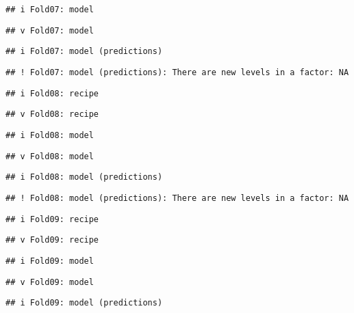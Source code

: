\documentclass[
]{article}
\begin{document}
\begin{verbatim}
## i Fold07: model
\end{verbatim}

\begin{verbatim}
## v Fold07: model
\end{verbatim}

\begin{verbatim}
## i Fold07: model (predictions)
\end{verbatim}

\begin{verbatim}
## ! Fold07: model (predictions): There are new levels in a factor: NA
\end{verbatim}

\begin{verbatim}
## i Fold08: recipe
\end{verbatim}

\begin{verbatim}
## v Fold08: recipe
\end{verbatim}

\begin{verbatim}
## i Fold08: model
\end{verbatim}

\begin{verbatim}
## v Fold08: model
\end{verbatim}

\begin{verbatim}
## i Fold08: model (predictions)
\end{verbatim}

\begin{verbatim}
## ! Fold08: model (predictions): There are new levels in a factor: NA
\end{verbatim}

\begin{verbatim}
## i Fold09: recipe
\end{verbatim}

\begin{verbatim}
## v Fold09: recipe
\end{verbatim}

\begin{verbatim}
## i Fold09: model
\end{verbatim}

\begin{verbatim}
## v Fold09: model
\end{verbatim}

\begin{verbatim}
## i Fold09: model (predictions)
\end{verbatim}
\end{document}
